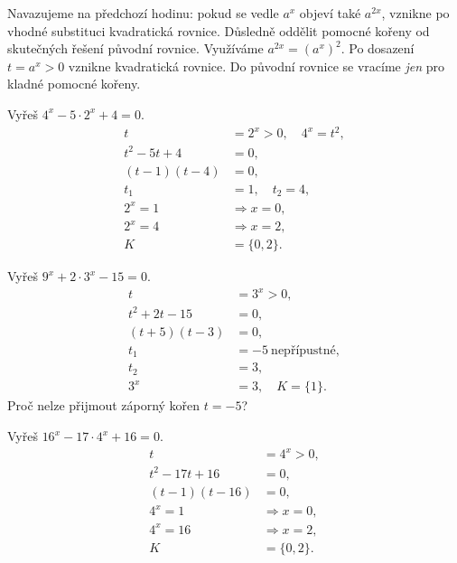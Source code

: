 \documentclass[11pt,a4paper]{article}
\begin{document}
Navazujeme na předchozí hodinu: pokud se vedle $a^x$ objeví také $a^{2x}$, vznikne po vhodné substituci kvadratická rovnice. Důsledně oddělit pomocné kořeny od skutečných řešení původní rovnice.
Využíváme $a^{2x}=(a^x)^2$. Po dosazení $t=a^x>0$ vznikne kvadratická rovnice. Do původní rovnice se vracíme \emph{jen} pro kladné pomocné kořeny.
\begin{prikladReseniBox}[title={Příklad 1}]
Vyřeš $4^x-5\cdot2^x+4=0$.
\tcblower
\[
\begin{aligned}t&=2^x>0,\quad 4^x=t^2,\\t^2-5t+4&=0,\\(t-1)(t-4)&=0,\\t_1&=1,\quad t_2=4,\\2^x=1&\Rightarrow x=0,\\2^x=4&\Rightarrow x=2,\\K&=\{0,2\}.\end{aligned}
\]

\end{prikladReseniBox}
\begin{prikladReseniBox}[title={Příklad 2}]
Vyřeš $9^x+2\cdot3^x-15=0$.
\tcblower
\[
\begin{aligned}t&=3^x>0,\\t^2+2t-15&=0,\\(t+5)(t-3)&=0,\\t_1&=-5\ \text{nepřípustné},\\t_2&=3,\\3^x&=3,\quad K=\{1\}.\end{aligned}
\]
Proč nelze přijmout záporný kořen $t=-5$?
\end{prikladReseniBox}
\begin{prikladReseniBox}[title={Příklad 3}]
Vyřeš $16^x-17\cdot4^x+16=0$.
\tcblower
\[
\begin{aligned}t&=4^x>0,\\t^2-17t+16&=0,\\(t-1)(t-16)&=0,\\4^x=1&\Rightarrow x=0,\\4^x=16&\Rightarrow x=2,\\K&=\{0,2\}.\end{aligned}
\]

\end{prikladReseniBox}
\end{document}
